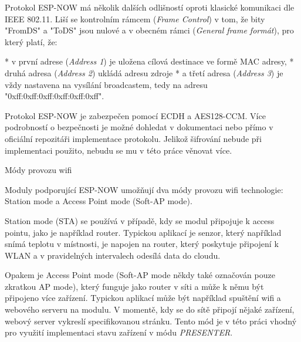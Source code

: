 Protokol ESP-NOW má několik dalších odlišností oproti klasické komunikaci dle IEEE 802.11. Liší se kontrolním rámcem ({\em Frame Control}) v tom, že bity "FromDS" a "ToDS" jsou nulové a v obecném rámci ({\em General frame formát}), pro který platí, že:

\begitems
* v první adrese ({\em Address 1}) je uložena cílová destinace ve formě MAC adresy,
* druhá adresa ({\em Address 2}) ukládá adresu zdroje
* a třetí adresa ({\em Address 3}) je vždy nastavena na vysílání broadcastem, tedy na adresu "0xff:0xff:0xff:0xff:0xff:0xff".
\enditems

Protokol ESP-NOW je zabezpečen pomocí ECDH a AES128-CCM. Více podrobností o bezpečnosti je možné dohledat v dokumentaci  nebo přímo v oficiální repozitáři implementace protokolu. Jelikož šifrování nebude při implementaci použito, nebudu se mu v této práce věnovat více.

\secc Módy provozu wifi

Moduly podporující ESP-NOW umožňují dva módy provozu wifi technologie: Station mode a Access Point mode (Soft-AP mode).

{\sbf Station mode} (STA) se používá v případě, kdy se modul připojuje k access pointu, jako je například router. Typickou aplikací je senzor, který například snímá teplotu v místnosti, je napojen na router, který poskytuje připojení k WLAN a v pravidelných intervalech odesílá data do cloudu.

Opakem je {\sbf Access Point mode} (Soft-AP mode někdy také označován pouze zkratkou AP mode), který funguje jako router v síti a může k němu být připojeno více zařízení. Typickou aplikací může být například spuštění wifi a webového serveru na modulu. V momentě, kdy se do sítě připojí nějaké zařízení, webový server vykreslí specifikovanou stránku.
Tento mód je v této práci vhodný pro využití implementaci stavu zařízení v módu {\em PRESENTER}.

